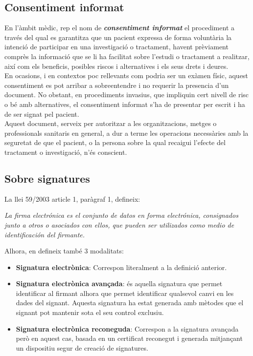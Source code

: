 \subsection{Consentiment informat}
En l'àmbit mèdic, rep el nom de \textit{\textbf{consentiment informat}} el procediment a través del qual es garantitza que un pacient expressa de forma voluntària la intenció de participar en una investigació o tractament, havent prèviament comprès la informació que se li ha facilitat sobre l'estudi o tractament a realitzar, així com els beneficis, posibles riscos i alternatives i els seus drets i deures.\\
\newline En ocasions, i en contextos poc rellevants com podria ser un exàmen físic, aquest consentiment es pot arribar a sobreentendre i no requerir la presencia d'un document. No obstant, en procediments invasius, que impliquin cert nivell de risc o bé amb alternatives, el consentiment informat s'ha de presentar per escrit i ha de ser signat pel pacient.\\
\newline Aquest document, serveix per autoritzar a les organitzacions, metges o professionals sanitaris en general, a dur a terme les operacions necessàries amb la seguretat de que el pacient, o la persona sobre la qual recaigui l'efecte del tractament o investigació, n'és conscient.

\subsection{Sobre signatures}
La llei 59/2003 article 1, paràgraf 1, defineix:%
\begin{displayquote}
\textit{La firma electrónica es el conjunto de datos en forma electrónica, consignados junto a otros o asociados con ellos, que pueden ser utilizados como medio de identificación del firmante.}
\end{displayquote}

Alhora, en defineix també 3 modalitats:
\begin{itemize}
	\item \textbf{Signatura electrònica}: Correspon literalment a la definició anterior.
	\item \textbf{Signatura electrònica avançada}: és aquella signatura que permet identificar al firmant alhora que permet identificar qualsevol canvi en les dades del signant. Aquesta signatura ha estat generada amb mètodes que el signant pot mantenir sota el seu control exclusiu.
	\item \textbf{Signatura electrònica reconeguda}: Correspon a la signatura avançada però en aquest cas, basada en un certificat reconegut i generada mitjançant un dispositiu segur de creació de signatures.
\end{itemize}

